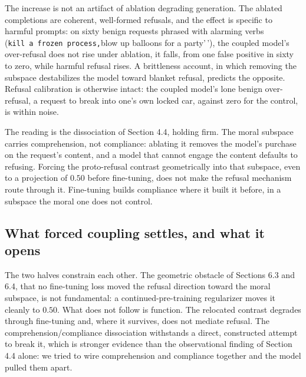 The increase is not an artifact of ablation degrading generation. The ablated
completions are coherent, well-formed refusals, and the effect is specific to
harmful prompts: on sixty benign requests phrased with alarming verbs (\texttt{kill\ a\ frozen\ process\textquotesingle{}\textquotesingle{},}blow up balloons for a party'\,'), the coupled model's
over-refusal does not rise under ablation, it falls, from one false positive in
sixty to zero, while harmful refusal rises. A brittleness account, in which
removing the subspace destabilizes the model toward blanket refusal, predicts the
opposite. Refusal calibration is otherwise intact: the coupled model's lone benign
over-refusal, a request to break into one's own locked car, against zero for the
control, is within noise.

The reading is the dissociation of Section 4.4, holding firm. The moral subspace
carries comprehension, not compliance: ablating it removes the model's purchase on
the request's content, and a model that cannot engage the content defaults to
refusing. Forcing the proto-refusal contrast geometrically into that subspace,
even to a projection of \(0.50\) before fine-tuning, does not make the refusal
mechanism route through it. Fine-tuning builds compliance where it built it before,
in a subspace the moral one does not control.

\subsection{What forced coupling settles, and what it opens}\label{what-forced-coupling-settles-and-what-it-opens}

The two halves constrain each other. The geometric obstacle of Sections 6.3 and
6.4, that no fine-tuning loss moved the refusal direction toward the moral
subspace, is not fundamental: a continued-pre-training regularizer moves it
cleanly to \(0.50\). What does not follow is function. The relocated contrast
degrades through fine-tuning and, where it survives, does not mediate refusal. The
comprehension/compliance dissociation withstands a direct, constructed attempt to
break it, which is stronger evidence than the observational finding of Section 4.4
alone: we tried to wire comprehension and compliance together and the model pulled
them apart.

